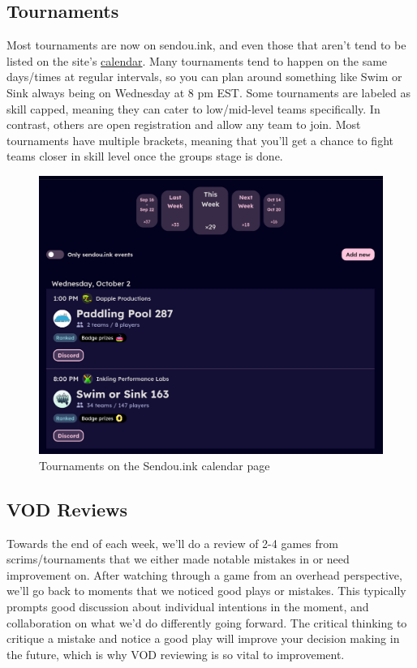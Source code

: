 \documentclass[12pt]{article}
\begin{document}
\subsection{Tournaments}
Most tournaments are now on sendou.ink, and even those that aren't tend to be listed on the site's \href{https://sendou.ink/calendar}{calendar}. Many tournaments tend to happen on the same days/times at regular intervals, so you can plan around something like Swim or Sink always being on Wednesday at 8 pm EST. Some tournaments are labeled as skill capped, meaning they can cater to low/mid-level teams specifically. In contrast, others are open registration and allow any team to join. Most tournaments have multiple brackets, meaning that you'll get a chance to fight teams closer in skill level once the groups stage is done.
\begin{figure}
    \centering
    \includegraphics[width=0.8\linewidth]{sendou_calendar.png}
\caption{Tournaments on the Sendou.ink calendar page}
\end{figure}

\subsection{VOD Reviews}
Towards the end of each week, we'll do a review of 2-4 games from scrims/tournaments that we either made notable mistakes in or need improvement on. After watching through a game from an overhead perspective, we'll go back to moments that we noticed good plays or mistakes. This typically prompts good discussion about individual intentions in the moment, and collaboration on what we'd do differently going forward. The critical thinking to critique a mistake and notice a good play will improve your decision making in the future, which is why VOD reviewing is so vital to improvement.
\end{document}
